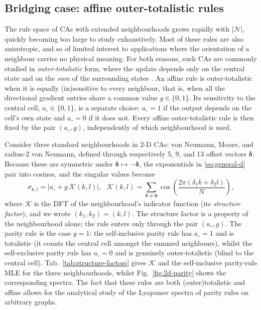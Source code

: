 \documentclass[a4paper,fleqn]{cas-dc}
\begin{document}
\subsection{Bridging case: affine outer-totalistic rules}
\label{subsec:bridging-case}

The rule space of CAs with extended neighbourhoods grows rapidly with $|\mathcal{N}|$, quickly becoming too large to study exhaustively. Most of these rules are also anisotropic, and so of limited interest to applications where the orientation of a neighbour carries no physical meaning. For both reasons, such CAs are commonly studied in \emph{outer-totalistic} form, where the update depends only on the central state and on the \emph{sum} of the surrounding states \cite{packard1985two}. An affine rule is outer-totalistic when it is equally (in)sensitive to every neighbour, that is, when all the directional gradient entries share a common value $g\in\{0,1\}$. Its sensitivity to the central cell, $a_\circ\in\{0,1\}$, is a separate choice: $a_\circ=1$ if the output depends on the cell's own state and $a_\circ=0$ if it does not. Every affine outer-totalistic rule is then fixed by the pair $(a_\circ,g)$, independently of which neighbourhood is used.

Consider three standard neighbourhoods in 2-D CAs: von Neumann, Moore, and radius-2 von Neumann, defined through respectively 5, 9, and 13 offset vectors $\boldsymbol{\delta}$. Because these are symmetric under $\boldsymbol{\delta}\mapsto-\boldsymbol{\delta}$, the exponentials in \eqref{eq:general-d} pair into cosines, and the singular values become
\begin{equation}
    \label{eq:ot-singular}
    \sigma_{k,l}=\bigl\lvert a_\circ+g\,\mathcal{K}(k,l)\bigr\rvert,\ \ \ 
    \mathcal{K}(k,l)=\sum_{\boldsymbol{\delta}\neq\boldsymbol{0}}
    \cos\left(\frac{2\pi(\delta_1 k+\delta_2 l)}{N}\right),
\end{equation}
where $\mathcal{K}$ is the DFT of the neighbourhood's indicator function (its \emph{structure factor}), and we wrote $(k_1, k_2) = (k,l)$. The structure factor is a property of the neighbourhood alone; the rule enters only through the pair $(a_\circ,g)$. The parity rule is the case $g=1$: the self-inclusive parity rule has $a_\circ=1$ and is totalistic (it counts the central cell amongst the summed neighbours), whilst the self-exclusive parity rule has $a_\circ=0$ and is genuinely outer-totalistic (blind to the central cell). Tab.~\ref{tab:structure-factors} gives $\mathcal{K}$ and the self-inclusive parity-rule MLE for the three neighbourhoods, whilst Fig.~\ref{fig:2d-parity} shows the corresponding spectra. The fact that these rules are both (outer)totalistic and affine allows for the analytical study of the Lyapunov spectra of parity rules on arbitrary graphs.
\end{document}
